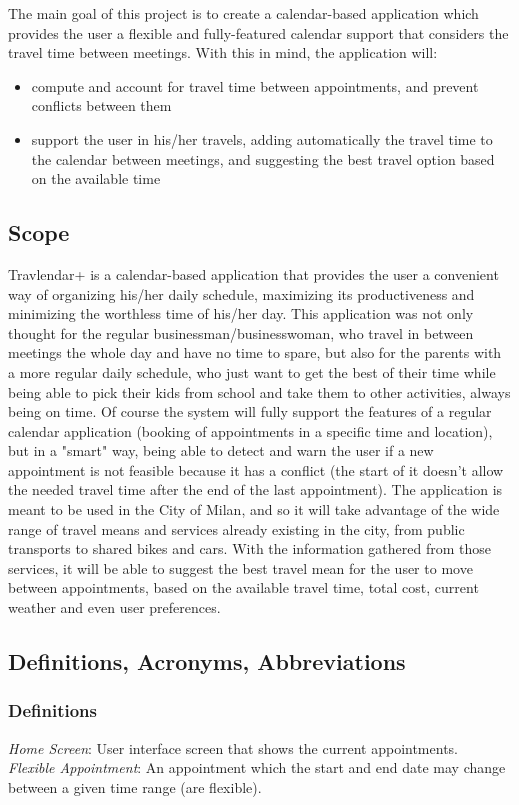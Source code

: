 \documentclass[12pt]{article}
\begin{document}
The main goal of this project is to create a calendar-based application which provides the user a flexible and fully-featured calendar support that considers the travel time between meetings. With this in mind, the application will:
\begin{itemize}
\item compute and account for travel time between appointments, and prevent conflicts between them
\item support the user in his/her travels, adding automatically the travel time to the calendar between meetings, and suggesting the best travel option based on the available time
\end{itemize}

\subsection{Scope}
Travlendar+ is a calendar-based application that provides the user a convenient way of organizing his/her daily schedule, maximizing its productiveness and minimizing the worthless time of his/her day. This application was not only thought for the regular businessman/businesswoman, who travel in between meetings the whole day and have no time to spare, but also for the parents with a more regular daily schedule, who just want to get the best of their time while being able to pick their kids from school and take them to other activities, always being on time.
Of course the system will fully support the features of a regular calendar application (booking of appointments in a specific time and location), but in a "smart" way, being able to detect and warn the user if a new appointment is not feasible because it has a conflict (the start of it doesn't allow the needed travel time after the end of the last appointment). The application is meant to be used in the City of Milan, and so it will take advantage of the wide range of travel means and services already existing in the city, from public transports to shared bikes and cars. With the information gathered from those services, it will be able to suggest the best travel mean for the user to move between appointments, based on the available travel time, total cost, current weather and even user preferences.


\subsection{Definitions, Acronyms, Abbreviations}
\subsubsection{Definitions}
\textit{Home Screen}: User interface screen that shows the current appointments.\\
\textit{Flexible Appointment}: An appointment which the start and end date may change between a given time range (are flexible).
\end{document}
